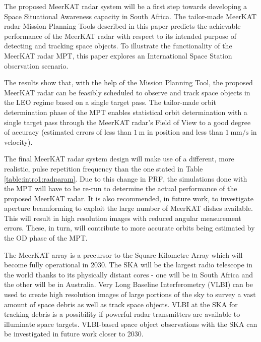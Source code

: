 \documentclass[conference]{IEEEtran}
\begin{document}
The proposed MeerKAT radar system will be a first step towards developing a Space Situational Awareness capacity in South Africa. The tailor-made MeerKAT radar Mission Planning Tools described in this paper predicts the achievable performance of the MeerKAT radar with respect to its intended purpose of detecting and tracking space objects. To illustrate the functionality of the MeerKAT radar MPT, this paper explores an International Space Station observation scenario. 

The results show that, with the help of the Mission Planning Tool, the proposed MeerKAT radar can be feasibly scheduled to observe and track space objects in the LEO regime based on a single target pass. The tailor-made orbit determination phase of the MPT enables statistical orbit determination with a single target pass through the MeerKAT radar's Field of View to a good degree of accuracy (estimated errors of less than $1~\mathrm{m}$ in position and less than $1~\mathrm{mm/s}$ in velocity). 

The final MeerKAT radar system design will make use of a different, more realistic, pulse repetition frequency than the one stated in Table \ref{table:intro1:radparam}. Due to this change in PRF, the simulations done with the MPT will have to be re-run to determine the actual performance of the proposed MeerKAT radar. It is also recommended, in future work, to investigate aperture beamforming to exploit the large number of MeerKAT dishes available. This will result in high resolution images with reduced angular measurement errors. These, in turn, will contribute to more accurate orbits being estimated by the OD phase of the MPT.

The MeerKAT array is a precursor to the Square Kilometre Array which will become fully operational in 2030. The SKA will be the largest radio telescope in the world thanks to its physically distant cores - one will be in South Africa and the other will be in Australia. Very Long Baseline Interferometry 
(VLBI)  can be used to create high resolution images of large portions of the sky to survey a vast amount of space debris as well as track space objects. VLBI at the SKA for tracking
debris is a possibility if powerful radar transmitters are
available to illuminate space targets. VLBI-based space object observations with the SKA can be investigated in future work closer to 2030.


\addtolength{\textheight}{-15cm}   %
\end{document}

